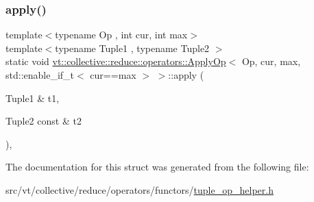 \subsubsection{\texorpdfstring{apply()}{apply()}}
{\footnotesize\ttfamily template$<$typename Op , int cur, int max$>$ \\
template$<$typename Tuple1 , typename Tuple2 $>$ \\
static void \hyperlink{structvt_1_1collective_1_1reduce_1_1operators_1_1_apply_op}{vt\+::collective\+::reduce\+::operators\+::\+Apply\+Op}$<$ Op, cur, max, std\+::enable\+\_\+if\+\_\+t$<$ cur==max $>$ $>$\+::apply (\begin{DoxyParamCaption}\item[{Tuple1 \&}]{t1,  }\item[{Tuple2 const \&}]{t2 }\end{DoxyParamCaption})\hspace{0.3cm}{\ttfamily [inline]}, {\ttfamily [static]}}



The documentation for this struct was generated from the following file\+:\begin{DoxyCompactItemize}
\item 
src/vt/collective/reduce/operators/functors/\hyperlink{tuple__op__helper_8h}{tuple\+\_\+op\+\_\+helper.\+h}\end{DoxyCompactItemize}
